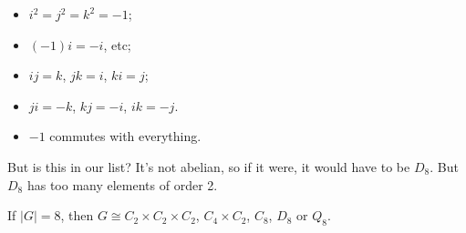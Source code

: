 \documentclass{../../template/note}
\begin{document}
\begin{example}
        \begin{itemize}
            \item \(i^2 = j^2 = k^2 = -1\);
            \item \((-1)i = -i\), etc;
            \item \(ij = k\), \(jk = i\), \(ki = j\);
            \item \(ji = -k\), \(kj = -i\), \(ik = -j\).
            \item \(-1\) commutes with everything.
        \end{itemize}
        But is this in our list? It's not abelian, so if it were, it would have to be \(D_8\). But \(D_8\) has too many elements of order 2.
    \end{example}
    
    \begin{lemma}
        If \(|G| = 8\), then \(G \cong C_2 \times C_2 \times C_2\), \(C_4 \times C_2\), \(C_8\), \(D_8\) or \(Q_8\).
    \end{lemma}
    
\end{document}
